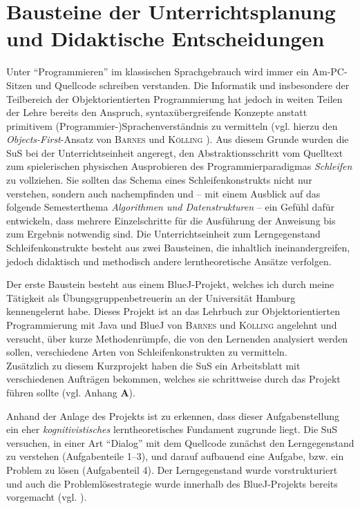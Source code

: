 \documentclass[paper=a4, DIV=13, BCOR=12mm, twoside=on, onecolumn=on, open = any, titlepage =on, parskip =half-, headsepline = on, footsepline = on, chapterprefix = on, sectionprefix = on, appendixprefix = off, fontsize = 12pt, numbers = noenddot, abstract = off]{scrreprt}
\begin{document}
\par \singlespacing
 \section{Bausteine der Unterrichtsplanung und Didaktische Entscheidungen}
\onehalfspacing
Unter "`Programmieren"' im klassischen Sprachgebrauch wird immer ein Am-PC-Sitzen und Quellcode schreiben verstanden. Die Informatik und insbesondere der Teilbereich der Objektorientierten Programmierung hat jedoch in weiten Teilen der Lehre bereits den Anspruch, syn{\-}tax{\-}übergreifende Konzepte anstatt primitivem (Programmier-){\-}Sprachenverständnis zu vermitteln (vgl. hierzu den \emph{Objects-First}-Ansatz von \textsc{Barnes} und \textsc{Kölling} \cite{barnes:03}). Aus diesem Grunde wurden die SuS bei der Unterrichtseinheit angeregt, den Abstraktionsschritt vom Quelltext zum spielerischen physischen Ausprobieren des Programmierparadigmas \emph{Schleifen} zu vollziehen. Sie sollten das Schema eines Schleifenkonstrukts nicht nur verstehen, sondern auch nachempfinden und -- mit einem Ausblick auf das folgende Semesterthema \emph{Algorithmen und Datenstrukturen} -- ein Gefühl dafür entwickeln, dass mehrere Einzelschritte für die Ausführung der Anweisung bis zum Ergebnis notwendig sind.  
Die Unterrichtseinheit zum Lerngegenstand Schleifenkonstrukte besteht aus zwei Bausteinen, die inhaltlich ineinandergreifen, jedoch didaktisch und methodisch andere lerntheoretische Ansätze verfolgen. 

Der erste Baustein besteht aus einem BlueJ-Projekt, welches ich durch meine Tätigkeit als Übungsgruppenbetreuerin an der Universität Hamburg kennengelernt habe. Dieses Projekt ist an das Lehrbuch zur Objektorientierten Programmierung mit Java und BlueJ von \textsc{Barnes} und \textsc{Kölling} \cite{barnes:03} angelehnt und versucht, über kurze Methodenrümpfe, die von den Lernenden analysiert werden sollen, verschiedene Arten von Schleifenkonstrukten zu vermitteln.\\
Zusätzlich zu diesem Kurzprojekt haben die SuS ein Arbeitsblatt mit verschiedenen Aufträgen bekommen, welches sie schrittweise durch das Projekt führen sollte (vgl. Anhang \textbf{A}).

Anhand der Anlage des Projekts ist zu erkennen, dass dieser Aufgabenstellung ein eher \emph{kognitivistisches} lerntheoretisches Fundament zugrunde liegt. Die SuS versuchen, in einer Art "`Dialog"' mit dem Quellcode zunächst den Lerngegenstand zu verstehen (Aufgabenteile 1--3), und darauf aufbauend eine Aufgabe, bzw. ein Problem zu lösen (Aufgabenteil 4). Der Lerngegenstand wurde vorstrukturiert und auch die Problemlösestrategie wurde innerhalb des BlueJ-Projekts bereits vorgemacht (vgl. \cite[S.219]{schwarzer:07}).
\end{document}
